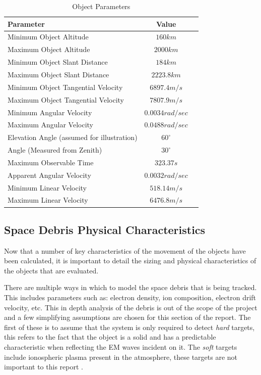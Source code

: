 \documentclass[11pt]{witseiepaper}
\begin{document}
\begin{bibunit}[witseie]
\begin{table}
    \caption{Object Parameters}
    \label{tab:ObjectParameters}
    \begin{center}
        \begin{tabular}{p{70mm}cp{70mm}}
            \hline 
            Parameter & Value \\
            \hline
            Minimum Object Altitude & $160 km$ \\
            Maximum Object Altitude & $2000 km$ \\
            Minimum Object Slant Distance & $184 km$ \\
            Maximum Object Slant Distance & $2223.8 km$ \\            
            Minimum Object Tangential Velocity & $6897.4 m/s$ \\
            Maximum Object Tangential Velocity & $7807.9 m/s$ \\
            Minimum Angular Velocity & $0.0034 rad/sec$ \\
            Maximum Angular Velocity & $0.0488 rad/sec$ \\
            Elevation Angle (assumed for illustration) & $60^{\circ}$ \\
            Angle (Measured from Zenith) & $30^{\circ}$ \\
            Maximum Observable Time & $323.37 s$ \\
            Apparent Angular Velocity & $0.0032 rad/sec$ \\
            Minimum Linear Velocity & $518.14 m/s$ \\
            Maximum Linear Velocity & $6476.8 m/s$ \\
        \end{tabular}
    \end{center}
\end{table}

\subsection{Space Debris Physical Characteristics} \label{sec:SpaceDebrisPhysicalCharacteristics}
Now that a number of key characteristics of the movement of the objects have been calculated, it is important to detail the sizing and physical characteristics of the objects that are evaluated.

There are multiple ways in which to model the space debris that is being tracked. This includes parameters such as: electron density, ion composition, electron drift velocity, etc. This in depth analysis of the debris is out of the scope of the project and a few simplifying assumptions are chosen for this section of the report.
The first of these is to assume that the system is only required to detect \textit{hard} targets, this refers to the fact that the object is a solid and has a predictable characteristic when reflecting the EM waves incident on it. The \textit{soft} targets include ionospheric plasma present in the atmosphere, these targets are not important to this report \cite{softTarget}.  


\end{bibunit}
\end{document}
